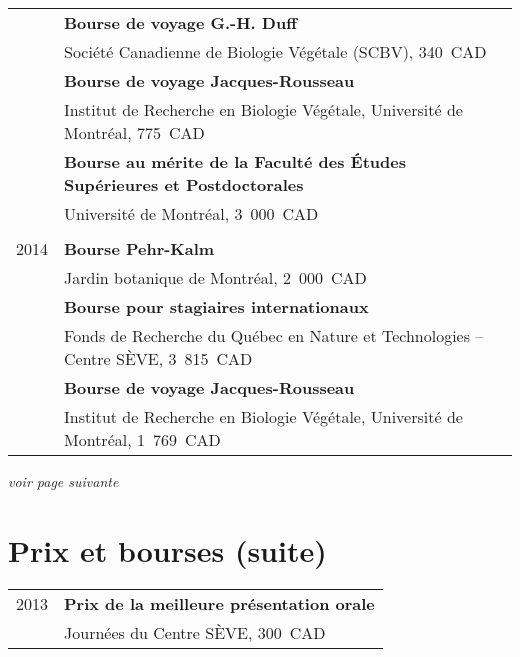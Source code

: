 \documentclass[letterpaper,10pt]{article}
\begin{document}
{\begin{tabular}{r|p{14cm}}
& \textbf{Bourse de voyage G.-H. Duff} \\
& Société Canadienne de Biologie Végétale (SCBV), 340~CAD \vspace{1.3mm} \\

& \textbf{Bourse de voyage Jacques-Rousseau} \\
& Institut de Recherche en Biologie Végétale, Université de Montréal, 775~CAD \vspace{1.3mm} \\

& \textbf{Bourse au mérite de la Faculté des Études Supérieures et Postdoctorales} \\
& Université de Montréal, 3~000~CAD\\

\multicolumn{2}{c}{} \\

2014

& \textbf{Bourse Pehr-Kalm} \\
& Jardin botanique de Montréal, 2~000~CAD  \vspace{1.3mm} \\

& \textbf{Bourse pour stagiaires internationaux} \\
& Fonds de Recherche du Québec en Nature et Technologies -- Centre SÈVE, 3~815~CAD  \vspace{1.3mm} \\

& \textbf{Bourse de voyage Jacques-Rousseau} \\
& Institut de Recherche en Biologie Végétale, Université de Montréal, 1~769~CAD\\

\end{tabular}

\vspace{3mm}
\emph{voir page suivante}

\section{Prix et bourses (suite)}
\begin{tabular}{r|p{14cm}}

2013

& \textbf{Prix de la meilleure présentation orale} \\
& Journées du Centre SÈVE, 300~CAD \vspace{1.3mm} \\


\end{tabular}}
\end{document}
